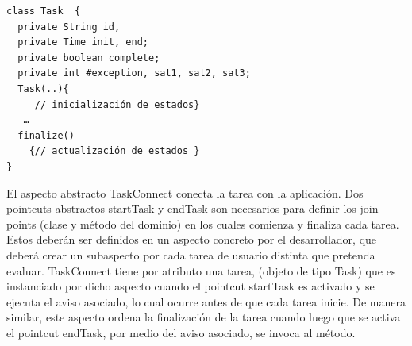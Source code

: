 \begin{verbatim}
class Task  {
  private String id,
  private Time init, end;
  private boolean complete;
  private int #exception, sat1, sat2, sat3;
  Task(..){
     // inicialización de estados}
   …
  finalize()
    {// actualización de estados }
}
\end{verbatim}

El aspecto abstracto TaskConnect conecta la tarea con la aplicación. Dos pointcuts abstractos startTask y endTask son necesarios para definir los join-points (clase y método del dominio)  en los cuales comienza y finaliza cada tarea. Estos deberán ser definidos en un aspecto concreto por el desarrollador, que deberá crear un subaspecto por cada tarea de usuario distinta que pretenda evaluar. TaskConnect  tiene por atributo una tarea, (objeto  de tipo Task) que es instanciado por dicho aspecto cuando el pointcut startTask es activado y se ejecuta el aviso asociado, lo cual ocurre antes de que cada tarea inicie. De manera similar, este aspecto ordena la finalización de la tarea cuando luego que se activa el pointcut endTask, por medio del aviso asociado, se invoca al método.  

